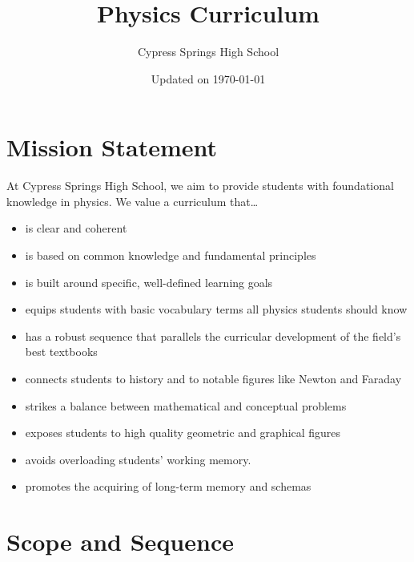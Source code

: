 \documentclass[dvipsnames]{article}
\title{Physics Curriculum}
\author{Cypress Springs High School}
\date{Updated on \today}
\begin{document}
\maketitle
\tableofcontents
\clearpage


\section*{Mission Statement}
\vspace{-1em}

At Cypress Springs High School, we aim to provide students with foundational knowledge in physics. We value a curriculum that\ldots 

\begin{itemize}[itemsep=0pt,topsep=0pt]
    \item is clear and coherent
    \item is based on common knowledge and fundamental principles
    \item is built around specific, well-defined learning goals
    \item equips students with basic vocabulary terms all physics students should know
    \item has a robust sequence that parallels the curricular development of the field's best textbooks
    \item connects students to history and to notable figures like Newton and Faraday
    \item strikes a balance between mathematical and conceptual problems
    \item exposes students to high quality geometric and graphical figures
    \item avoids overloading students' working memory.
    \item promotes the acquiring of long-term memory and schemas
\end{itemize}

\section*{Scope and Sequence}
\vspace{-1em}
\end{document}
